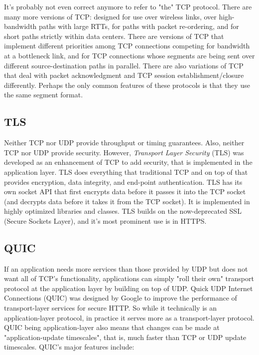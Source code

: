 \documentclass[table, xcdraw]{article}%
\begin{document}
It's probably not even correct anymore to refer to "the" TCP protocol. There are many more versions of TCP: designed for use over wireless links, over high-bandwidth paths with large RTTs, for paths with packet re-ordering, and for short paths strictly within data centers. There are versions of TCP that implement different priorities among TCP connections competing for bandwidth at a bottleneck link, and for TCP connections whose segments are being sent over different source-destination paths in parallel. There are also variations of TCP that deal with packet acknowledgment and TCP session establishment/closure differently. Perhaps the only common features of these protocols is that they use the same segment format.

\subsection{TLS}

Neither TCP nor UDP provide throughput or timing guarantees. Also, neither TCP nor UDP provide security. However, \emph{Transport Layer Security} (TLS) was developed as an enhancement of TCP to add security, that is implemented in the application layer. TLS does everything that traditional TCP and on top of that provides encryption, data integrity, and end-point authentication. TLS has its own socket API that first encrypts data before it passes it into the TCP socket (and decrypts data before it takes it from the TCP socket). It is implemented in highly optimized libraries and classes. TLS builds on the now-deprecated SSL (Secure Sockets Layer), and it's most prominent use is in HTTPS.

\subsection{QUIC} \label{ch:transport:quic}

If an application needs more services than those provided by UDP but does not want all of TCP's functionality, applications can simply "roll their own" transport protocol at the application layer by building on top of UDP. Quick UDP Internet Connections (QUIC) was designed by Google to improve the performance of transport-layer services for secure HTTP. So while it technically is an application-layer protocol, in practice it serves more as a transport-layer protocol. QUIC being application-layer also means that changes can be made at "application-update timescales", that is, much faster than
TCP or UDP update timescales. QUIC's major features include:
\end{document}
